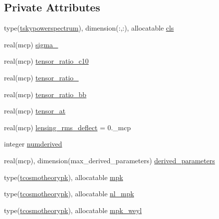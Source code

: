 \subsection*{Private Attributes}
\begin{DoxyCompactItemize}
\item 
type(\mbox{\hyperlink{structcosmotheory_1_1tskypowerspectrum}{tskypowerspectrum}}), dimension(\+:,\+:), allocatable \mbox{\hyperlink{structcosmotheory_1_1tcosmotheorypredictions_a58e7d80430975b2953c4302a430066a4}{cls}}
\item 
real(mcp) \mbox{\hyperlink{structcosmotheory_1_1tcosmotheorypredictions_ae20583ad53b0b5b8b3c2bcee92528e11}{sigma\+\_}}
\item 
real(mcp) \mbox{\hyperlink{structcosmotheory_1_1tcosmotheorypredictions_aa6c29163f23823135815b33f0e39f716}{tensor\+\_\+ratio\+\_\+c10}}
\item 
real(mcp) \mbox{\hyperlink{structcosmotheory_1_1tcosmotheorypredictions_a681fdf5845645d9d1d8eb6999945133d}{tensor\+\_\+ratio\+\_}}
\item 
real(mcp) \mbox{\hyperlink{structcosmotheory_1_1tcosmotheorypredictions_aa0e2731ec7b3c02ed1b272fe43553a24}{tensor\+\_\+ratio\+\_\+bb}}
\item 
real(mcp) \mbox{\hyperlink{structcosmotheory_1_1tcosmotheorypredictions_a9df925be7fcc34a4cadaef49e1fa9348}{tensor\+\_\+at}}
\item 
real(mcp) \mbox{\hyperlink{structcosmotheory_1_1tcosmotheorypredictions_afd81a2bd2cee2236c931a32fe1a295c1}{lensing\+\_\+rms\+\_\+deflect}} = 0.\+\_\+mcp
\item 
integer \mbox{\hyperlink{structcosmotheory_1_1tcosmotheorypredictions_ab1a0ff7d10b68f19b33c0b45eaf28e85}{numderived}}
\item 
real(mcp), dimension(max\+\_\+derived\+\_\+parameters) \mbox{\hyperlink{structcosmotheory_1_1tcosmotheorypredictions_a02f423370c415a35d7fd31d87f3677a4}{derived\+\_\+parameters}}
\item 
type(\mbox{\hyperlink{structcosmotheory_1_1tcosmotheorypk}{tcosmotheorypk}}), allocatable \mbox{\hyperlink{structcosmotheory_1_1tcosmotheorypredictions_a58781393dc7704319f71563f9840b91b}{mpk}}
\item 
type(\mbox{\hyperlink{structcosmotheory_1_1tcosmotheorypk}{tcosmotheorypk}}), allocatable \mbox{\hyperlink{structcosmotheory_1_1tcosmotheorypredictions_a536deb9a02ce33c4a780a077fd775e77}{nl\+\_\+mpk}}
\item 
type(\mbox{\hyperlink{structcosmotheory_1_1tcosmotheorypk}{tcosmotheorypk}}), allocatable \mbox{\hyperlink{structcosmotheory_1_1tcosmotheorypredictions_ab51bcc4e0dc7cc17daf5f561eb97607f}{mpk\+\_\+weyl}}

\end{DoxyCompactItemize}
